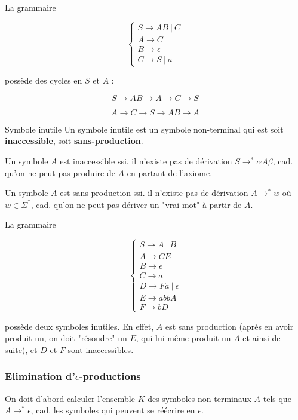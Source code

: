 \begin{example}
\label{gramsscycle1}
La grammaire 

\[
\begin{cases}
S \rightarrow AB~|~C\\
A \rightarrow C \\
B \rightarrow \epsilon \\
C \rightarrow S~|~a 
\end{cases}
\]

possède des cycles en $S$ et $A$ :

\[
S \rightarrow AB \rightarrow A \rightarrow C \rightarrow S
\]

\[
A \rightarrow C \rightarrow S \rightarrow AB \rightarrow A
\]
\end{example}

\begin{definition}{Symbole inutile}{}
Un symbole inutile est un symbole non-terminal qui est soit \textbf{inaccessible}, soit \textbf{sans-production}. 

Un symbole $A$ est inaccessible ssi. il n'existe pas de dérivation $S \rightarrow^* \alpha A \beta$, cad. qu'on ne peut pas produire de $A$ en partant de l'axiome. 

Un symbole $A$ est sans production ssi. il n'existe pas de dérivation $A \rightarrow^* w$ où $w \in \Sigma^*$, cad. qu'on ne peut pas dériver un "vrai mot" à partir de $A$.
\end{definition}

\begin{example}
\label{gramsymbsinutiles1}
La grammaire 

\[
\begin{cases}
S \rightarrow A~|~B \\
A \rightarrow CE \\
B \rightarrow \epsilon \\
C \rightarrow a \\
D \rightarrow Fa~|~\epsilon \\
E \rightarrow abbA \\
F \rightarrow bD
\end{cases}
\]

possède deux symboles inutiles. En effet, $A$ est sans production (après en avoir produit un, on doit "résoudre" un $E$, qui lui-même produit un $A$ et ainsi de suite), et $D$ et $F$ sont inaccessibles.

\end{example}

\subsubsection{Elimination d'$\epsilon$-productions}
\label{gramepsilon}
On doit d'abord calculer l'ensemble $K$ des symboles non-terminaux $A$ tels que $A \rightarrow^* \epsilon$, cad. les symboles qui peuvent se réécrire en $\epsilon$.

